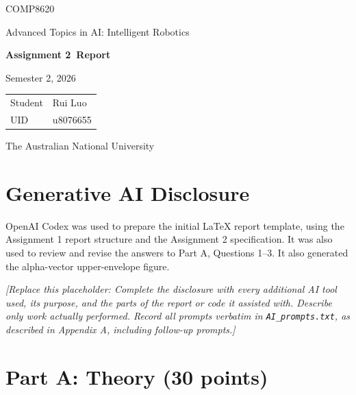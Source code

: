 \documentclass[11pt,a4paper]{article}
\newcommand{\studentname}{Rui Luo}
\newcommand{\studentuid}{u8076655}
\newcommand{\coursecode}{COMP8620}
\newcommand{\coursetitle}{Advanced Topics in AI: Intelligent Robotics}
\newcommand{\assignmenttitle}{Assignment 2}
\newcommand{\semester}{Semester 2, 2026}
\newcommand{\placeholder}[1]{%
  \par\smallskip
  \noindent\textcolor{placeholderGray}{\textit{[Replace this placeholder: #1]}}
  \par\smallskip
}
\begin{document}

\begin{titlepage}
  \centering
  \vspace*{30mm}
  {\Large\coursecode\par}
  \vspace{4mm}
  {\Large\coursetitle\par}
  \vspace{16mm}
  {\huge\bfseries\assignmenttitle\ Report\par}
  \vspace{5mm}
  {\large\semester\par}
  \vfill
  \begin{tabular}{@{}ll@{}}
    \toprule
    Student & \studentname \\
    UID & \studentuid \\
    \bottomrule
  \end{tabular}
  \vfill
  {\large The Australian National University\par}
  \vspace{10mm}
\end{titlepage}

\section*{Generative AI Disclosure}
\label{sec:ai-disclosure}
OpenAI Codex was used to prepare the initial LaTeX report template, using the
Assignment 1 report structure and the Assignment 2 specification.
It was also used to review and revise the answers to Part A, Questions 1--3.
It also generated the alpha-vector upper-envelope figure.
\placeholder{Complete the disclosure with every additional AI tool used, its
purpose, and the parts of the report or code it assisted with. Describe only
work actually performed. Record all prompts verbatim in \texttt{AI\_prompts.txt}, as described in
Appendix A, including follow-up prompts.}

\section*{Part A: Theory (30 points)}
\end{document}
